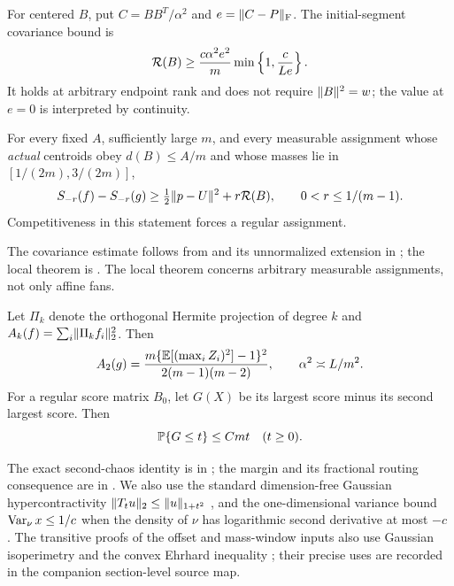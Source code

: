 \begin{prior}
\label{prior:local-global}
For centered $B$, put $C=BB^T/\alpha^2$ and $e=\lVert C-P\rVert_{\mathrm F}$.
The initial-segment covariance bound is
\begin{equation}\label{eq:global-covariance-floor}
 \mathcal R(B)\ge \frac{c\alpha^2e^2}{m}
                   \min\left\{1,\frac{c}{Le}\right\}.
\end{equation}
It holds at arbitrary endpoint rank and does not require
$\lVert B\rVert^2=w$; the value at $e=0$ is interpreted by continuity.

For every fixed $A$, sufficiently large $m$, and every measurable
assignment whose \emph{actual} centroids obey $d(B)\le A/m$ and whose
masses lie in $[1/(2m),3/(2m)]$,
\begin{equation}\label{eq:local-noise}
 S_{-r}(f)-S_{-r}(g)\ge \tfrac12\lVert p-U\rVert^2+r\mathcal R(B),
                   \qquad0<r\le1/(m-1).
\end{equation}
Competitiveness in this statement forces a regular assignment.
\end{prior}
The covariance estimate follows from \cite{facetbootstrap} and its
unnormalized extension in \cite{equalrowcap}; the local theorem is
\cite{localscoreball}. The local theorem concerns arbitrary measurable
assignments, not only affine fans.

\begin{prior}
\label{prior:regular}
Let $\Pi_k$ denote the orthogonal Hermite projection of degree $k$ and
$A_k(f)=\sum_i\lVert \Pi_k f_i\rVert_2^2$. Then
\begin{equation}\label{eq:A2-reference}
 A_2(g)=\frac{m\{\mathbb E[(\max_i Z_i)^2]-1\}^2}{2(m-1)(m-2)},
 \qquad \alpha^2\asymp L/m^2.
\end{equation}
For a regular score matrix $B_0$, let $G(X)$ be its largest score minus
its second largest score. Then
\begin{equation}\label{eq:regular-margin}
                        \mathbb P\{G\le t\}\le Cmt\quad(t\ge0).
\end{equation}
\end{prior}
The exact second-chaos identity is in \cite{localization}; the margin
and its fractional routing consequence are in \cite{globaltail}.
We also use the standard dimension-free Gaussian hypercontractivity
$\lVert T_tu\rVert_2\le\lVert u\rVert_{1+t^2}$ \cite{Gross}, and the one-dimensional variance
bound $\operatorname{Var}_\nu x\le1/c$ when the density of $\nu$ has logarithmic
second derivative at most $-c$ \cite{BrascampLieb}. The transitive proofs
of the offset and mass-window inputs also use Gaussian isoperimetry
\cite{Borell} and the convex Ehrhard inequality \cite{Latala}; their
precise uses are recorded in the companion section-level source map.

